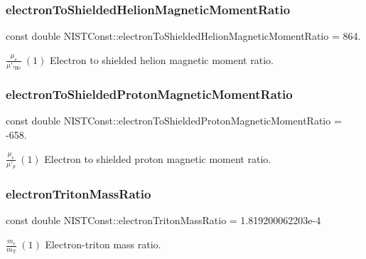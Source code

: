 \subsubsection{\texorpdfstring{electron\+To\+Shielded\+Helion\+Magnetic\+Moment\+Ratio}{electronToShieldedHelionMagneticMomentRatio}}
{\footnotesize\ttfamily const double N\+I\+S\+T\+Const\+::electron\+To\+Shielded\+Helion\+Magnetic\+Moment\+Ratio = 864.}

$\frac{\mu_e}{\mu'_{^3\textrm{He}}} \ (1)$ Electron to shielded helion magnetic moment ratio. \mbox{\label{group___electron_gacf35e7562c94178f6b182cff46131b6d}} 
\subsubsection{\texorpdfstring{electron\+To\+Shielded\+Proton\+Magnetic\+Moment\+Ratio}{electronToShieldedProtonMagneticMomentRatio}}
{\footnotesize\ttfamily const double N\+I\+S\+T\+Const\+::electron\+To\+Shielded\+Proton\+Magnetic\+Moment\+Ratio = -\/658.}

$\frac{\mu_e}{\mu'_p} \ (1)$ Electron to shielded proton magnetic moment ratio. \mbox{\label{group___electron_gac9bfee1055b6fd5d3dabb3126318b52e}} 
\subsubsection{\texorpdfstring{electron\+Triton\+Mass\+Ratio}{electronTritonMassRatio}}
{\footnotesize\ttfamily const double N\+I\+S\+T\+Const\+::electron\+Triton\+Mass\+Ratio = 1.\+819200062203e-\/4}

$\frac{m_e}{m_\textrm{T}} \ (1)$ Electron-\/triton mass ratio. 